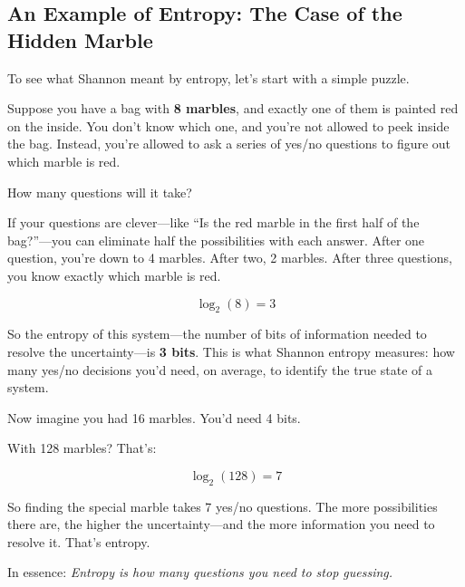 \subsection{An Example of Entropy: The Case of the Hidden Marble}

To see what Shannon meant by entropy, let’s start with a simple puzzle.

Suppose you have a bag with \textbf{8 marbles}, and exactly one of them is painted red on the inside. You don’t know which one, and you’re not allowed to peek inside the bag. Instead, you’re allowed to ask a series of yes/no questions to figure out which marble is red.

How many questions will it take?

If your questions are clever—like “Is the red marble in the first half of the bag?”—you can eliminate half the possibilities with each answer. After one question, you’re down to 4 marbles. After two, 2 marbles. After three questions, you know exactly which marble is red.

\[
\log_2(8) = 3
\]

So the entropy of this system—the number of bits of information needed to resolve the uncertainty—is \textbf{3 bits}. This is what Shannon entropy measures: how many yes/no decisions you’d need, on average, to identify the true state of a system.

\medskip

Now imagine you had 16 marbles. You’d need 4 bits.

With 128 marbles? That’s:

\[
\log_2(128) = 7
\]

So finding the special marble takes 7 yes/no questions. The more possibilities there are, the higher the uncertainty—and the more information you need to resolve it. That’s entropy.

\medskip

In essence: \textit{Entropy is how many questions you need to stop guessing.}


